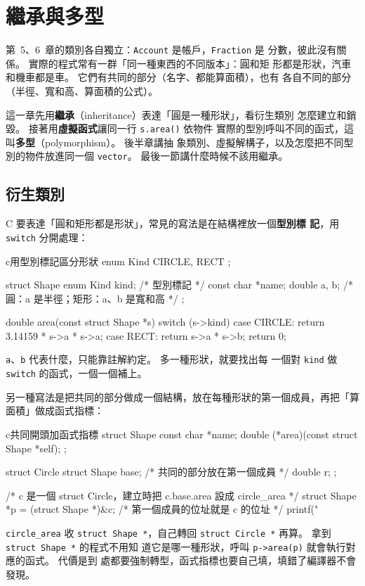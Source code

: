 \chapter{繼承與多型}
\label{ch:inheritance}

第~5、6~章的類別各自獨立：\texttt{Account} 是帳戶，\texttt{Fraction} 是
分數，彼此沒有關係。 實際的程式常有一群「同一種東西的不同版本」：圓和矩
形都是形狀，汽車和機車都是車。 它們有共同的部分（名字、都能算面積），也有
各自不同的部分（半徑、寬和高、算面積的公式）。

這一章先用\textbf{繼承}（inheritance）表達「圓是一種形狀」，看衍生類別
怎麼建立和銷毀。 接著用\textbf{虛擬函式}讓同一行 \texttt{s.area()} 依物件
實際的型別呼叫不同的函式，這叫\textbf{多型}（polymorphism）。 後半章講抽
象類別、虛擬解構子，以及怎麼把不同型別的物件放進同一個 \texttt{vector}。
最後一節講什麼時候不該用繼承。

\section{衍生類別}
\label{sec:derived}

\begin{crecap}[型別標記與共同開頭]
C 要表達「圓和矩形都是形狀」，常見的寫法是在結構裡放一個\textbf{型別標
記}，用 \texttt{switch} 分開處理：

\begin{code}{c}{用型別標記區分形狀}
enum Kind { CIRCLE, RECT };

struct Shape {
    enum Kind kind;        /* 型別標記 */
    const char *name;
    double a, b;           /* 圓：a 是半徑；矩形：a、b 是寬和高 */
};

double area(const struct Shape *s) {
    switch (s->kind) {
    case CIRCLE: return 3.14159 * s->a * s->a;
    case RECT:   return s->a * s->b;
    }
    return 0;
}
\end{code}

\texttt{a}、\texttt{b} 代表什麼，只能靠註解約定。 多一種形狀，就要找出每
一個對 \texttt{kind} 做 \texttt{switch} 的函式，一個一個補上。

另一種寫法是把共同的部分做成一個結構，放在每種形狀的第一個成員，再把「算
面積」做成函式指標：

\begin{code}{c}{共同開頭加函式指標}
struct Shape {
    const char *name;
    double (*area)(const struct Shape *self);
};

struct Circle {
    struct Shape base;     /* 共同的部分放在第一個成員 */
    double r;
};

/* c 是一個 struct Circle，建立時把 c.base.area 設成 circle_area */
struct Shape *p = (struct Shape *)&c;   /* 第一個成員的位址就是 c 的位址 */
printf("%
\end{code}

\texttt{circle\_area} 收 \texttt{struct Shape *}，自己轉回
\texttt{struct Circle *} 再算。 拿到 \texttt{struct Shape *} 的程式不用知
道它是哪一種形狀，呼叫 \texttt{p->area(p)} 就會執行對應的函式。 代價是到
處都要強制轉型，函式指標也要自己填，填錯了編譯器不會發現。
\end{crecap}

